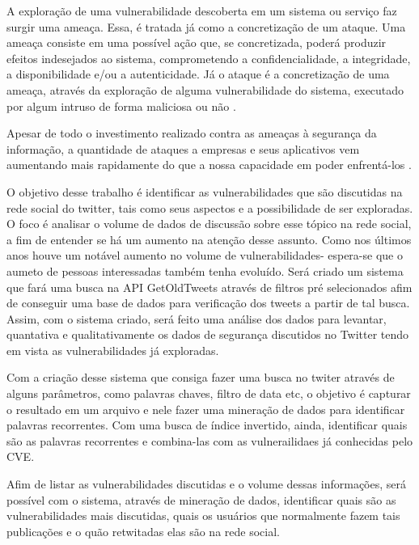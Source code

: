 A exploração de uma vulnerabilidade descoberta em um sistema ou serviço faz surgir uma ameaça. Essa, é tratada já como a concretização de um ataque. Uma ameaça consiste em uma possível ação que, se concretizada, poderá produzir efeitos indesejados ao sistema, comprometendo a confidencialidade, a integridade, a disponibilidade e/ou a autenticidade. Já o ataque é a concretização de uma ameaça, através da exploração de alguma vulnerabilidade do sistema, executado por algum intruso de forma maliciosa ou não \cite{Mello2006}.

Apesar de todo o investimento realizado contra as ameaças à segurança da informação, a quantidade de ataques a empresas e seus aplicativos vem aumentando mais rapidamente do que a nossa capacidade em poder enfrentá-los \cite{ALVESBATISTA2007}.

O objetivo desse trabalho é identificar as vulnerabilidades que são discutidas na rede social do twitter, tais como seus aspectos e a possibilidade de ser exploradas. O foco é analisar o volume de dados de discussão sobre esse tópico na rede social, a fim de entender se há um aumento na atenção desse assunto. Como nos últimos anos houve um notável aumento no volume de vulnerabilidades- espera-se que o aumeto de pessoas interessadas também tenha evoluído. Será criado um sistema que fará uma busca na API GetOldTweets \cite{Pythoncommunity} através de filtros pré selecionados afim de conseguir uma base de dados para verificação dos tweets a partir de tal busca. Assim, com o sistema criado, será feito uma análise dos dados para levantar, quantativa e qualitativamente os dados de segurança discutidos no Twitter tendo em vista as vulnerabilidades já exploradas.

Com a criação desse sistema que consiga fazer uma busca no twiter através de alguns parâmetros, como palavras chaves, filtro de data etc, o objetivo é capturar o resultado em um arquivo e nele fazer uma mineração de dados para identificar palavras recorrentes. Com uma busca de índice invertido, ainda, identificar quais são as palavras recorrentes e combina-las com as vulnerailidaes já conhecidas pelo CVE.

Afim de listar as vulnerabilidades discutidas e o volume dessas informações, será possível com o sistema, através de mineração de dados, identificar quais são as vulnerabilidades mais discutidas, quais os usuários que normalmente fazem tais publicações e o quão retwitadas elas são na rede social.




